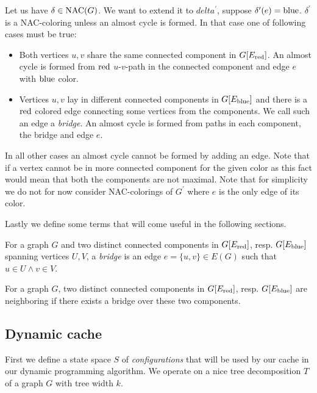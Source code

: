 Let us have \( \delta \in \text{NAC} (G) \).
We want to extend it to \( delta^\prime \), suppose \( \delta^\prime(e) = \text{blue} \).
\( \delta^\prime \) is a NAC-coloring unless an almost cycle is formed.
In that case one of following cases must be true:
%
\begin{itemize}
	\item Both vertices \( u, v \) share the same connected component in \( G[E_\text{red}] \).
	      An almost cycle is formed
	      from \( \text{red} \) \( u \)-\( v \)-path in the connected component
	      and edge \( e \) with \( \text{blue} \) color.
	\item Vertices \( u, v \) lay in different connected components in \( G[E_\text{blue}] \)
	      and there is a \( \text{red} \) colored edge connecting some vertices from the components.
	      We call such an edge a \emph{bridge}.
	      An almost cycle is formed from paths in each component, the bridge and edge \( e \).
\end{itemize}
%
In all other cases an almost cycle cannot be formed by adding an edge.
Note that if a vertex cannot be in more connected component for the given color
as this fact would mean that both the components are not maximal.
Note that for simplicity we do not for now consider
NAC-colorings of \( G^\prime \)
where \( e \) is the only edge of its color.

Lastly we define some terms that will come useful in the following sections.
%
\begin{definition}[Bridge]
	For a graph \( G \) and two distinct connected components
	in \( G[E_\text{red}] \), resp. \( G[E_\text{blue}] \)
	spanning vertices \( U, V \),
	a \emph{bridge} is an edge \( e = \{u, v\} \in E(G) \) such that \( u \in U \land v \in V \).
\end{definition}
%
%
\begin{definition}
	For a graph \( G \), two distinct connected components
	in \( G[E_\text{red}] \), resp. \( G[E_\text{blue}] \)
	are neighboring if there exists a bridge over these two components.
\end{definition}
%

\subsection{Dynamic cache}

First we define a state space \( S \) of \emph{configurations}
that will be used by our cache in our dynamic programming algorithm.
We operate on a nice tree decomposition \( T \) of a graph \( G \)
with tree width \( k \).

